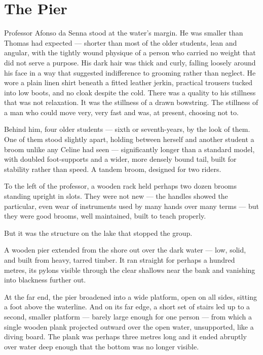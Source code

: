 \section*{The Pier}
 
Professor Afonso da Senna stood at the water's margin. He was smaller than Thomas had expected --- shorter than most of the older students, lean and angular, with the tightly wound physique of a person who carried no weight that did not serve a purpose. His dark hair was thick and curly, falling loosely around his face in a way that suggested indifference to grooming rather than neglect. He wore a plain linen shirt beneath a fitted leather jerkin, practical trousers tucked into low boots, and no cloak despite the cold. There was a quality to his stillness that was not relaxation. It was the stillness of a drawn bowstring. The stillness of a man who could move very, very fast and was, at present, choosing not to.
 
Behind him, four older students --- sixth or seventh-years, by the look of them. One of them stood slightly apart, holding between herself and another student a broom unlike any Celine had seen --- significantly longer than a standard model, with doubled foot-supports and a wider, more densely bound tail, built for stability rather than speed. A tandem broom, designed for two riders.
 
To the left of the professor, a wooden rack held perhaps two dozen brooms standing upright in slots. They were not new --- the handles showed the particular, even wear of instruments used by many hands over many terms --- but they were good brooms, well maintained, built to teach properly.
 
But it was the structure on the lake that stopped the group.
 
A wooden pier extended from the shore out over the dark water --- low, solid, and built from heavy, tarred timber. It ran straight for perhaps a hundred metres, its pylons visible through the clear shallows near the bank and vanishing into blackness further out.
 
At the far end, the pier broadened into a wide platform, open on all sides, sitting a foot above the waterline. And on its far edge, a short set of stairs led up to a second, smaller platform --- barely large enough for one person --- from which a single wooden plank projected outward over the open water, unsupported, like a diving board. The plank was perhaps three metres long and it ended abruptly over water deep enough that the bottom was no longer visible.
 
